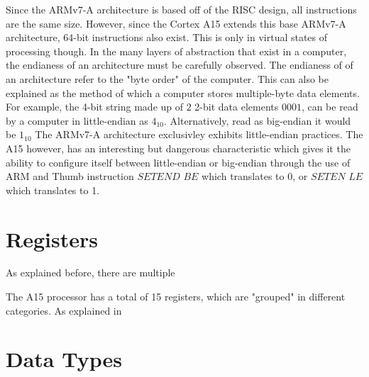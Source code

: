 \documentclass[12pt]{scrreprt}
\begin{document}
	Since the ARMv7-A architecture is based off of the RISC design, all instructions are the same size. However, since the Cortex A15 extends
	this base ARMv7-A architecture, 64-bit instructions also exist. This is only in virtual states of processing though.
	In the many layers of abstraction that exist in a computer, the endianess of an architecture must be carefully observed. The endianess of
	of an architecture refer to the "byte order" of the computer. This can also be explained as the method of which a computer stores
	multiple-byte data elements. For example, the 4-bit string made up of $2$ 2-bit data elements $0001$, can be read by a computer in little-endian as $4_{10}$. Alternatively, read as big-endian it would be $1_{10}$ The ARMv7-A architecture exclusivley exhibits little-endian practices. The A15 however, has an interesting but dangerous characteristic which gives it the ability to configure itself between little-endian or big-endian through the use of ARM and Thumb instruction $SETEND$ $BE$ which translates to 0, or $SETEN$ $LE$ which translates to 1.



{\let\clearpage\relax\chapter{Registers}}

	As explained before, there are multiple 

	The A15 processor has a total of 15 registers, which are "grouped" in different categories. As explained in 




{\let\clearpage\relax\chapter{Data Types}}
\end{document}

